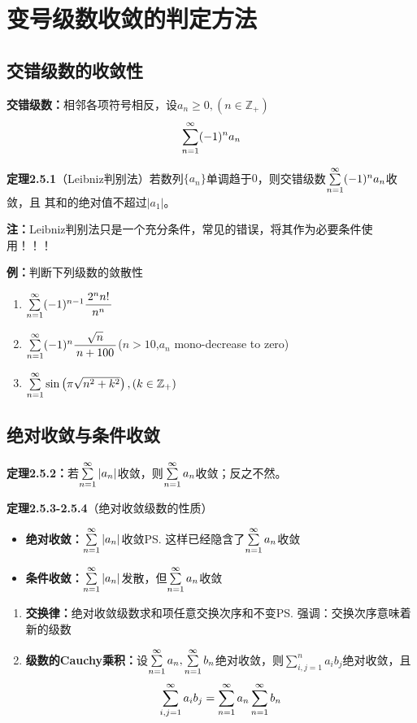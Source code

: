 \section{变号级数收敛的判定方法}

\subsection{交错级数的收敛性}

{\bf 交错级数：}相邻各项符号相反，设$a_n\geq 0,(n\in\mathbb{Z}_+)$
$$\sum\limits_{n=1}^{\infty}(-1)^na_n$$

{\bf 定理2.5.1}（Leibniz判别法）若数列$\{a_n\}$单调趋于$0$，则交错级数$\sum\limits_{n=1}^{\infty} (-1)^na_n$收敛，且
其和的绝对值不超过$|a_1|$。

{\bf 注：}Leibniz判别法只是一个充分条件，常见的错误，将其作为必要条件使用！！！

{\bf 例：}判断下列级数的敛散性
\begin{enumerate} [(1)]
  \setlength{\itemindent}{1cm}
  \item $\sum\limits_{n=1}^{\infty}(-1)^{n-1}\displaystyle\frac{\,{2^nn!}\,}{\,{n^n}\,}$ 
  \item $\sum\limits_{n=1}^{\infty}(-1)^n\displaystyle\frac{\,{\sqrt{n}}\,}{\,{n+100}\,}$\hfill{($n>10$,$a_n$ mono-decrease to
  zero)}
  \item $\sum\limits_{n=1}^{\infty}\sin\left(\pi\sqrt{n^2+k^2}\right),(k\in\mathbb{Z}_+)$
\end{enumerate}

\subsection{绝对收敛与条件收敛}

{\bf 定理2.5.2：}若$\sum\limits_{n=1}^{\infty} |a_n|$收敛，则$\sum\limits_{n=1}^{\infty} a_n$收敛；反之不然。

{\bf 定理2.5.3-2.5.4}（绝对收敛级数的性质）

\begin{itemize}
  \setlength{\itemindent}{1cm}
  \item {\bf 绝对收敛：}$\sum\limits_{n=1}^{\infty} |a_n|$收敛\ps{这样已经隐含了$\sum\limits_{n=1}^{\infty} a_n$收敛}
  \item {\bf 条件收敛：}$\sum\limits_{n=1}^{\infty} |a_n|$发散，但$\sum\limits_{n=1}^{\infty} a_n$收敛
\end{itemize}

\begin{enumerate}[(1)]
  \setlength{\itemindent}{1cm}
  \item {\bf 交换律：}绝对收敛级数求和项任意交换次序和不变\ps{强调：交换次序意味着新的级数}
  \item {\bf 级数的Cauchy乘积：}设$\sum\limits_{n=1}^{\infty} a_n,\sum\limits_{n=1}^{\infty}
	  b_n$绝对收敛，则$\sum\limits_{i,j=1}^na_ib_j$绝对收敛，且
	  $$\sum\limits_{i,j=1}^{\infty}a_ib_j=\sum\limits_{n=1}^{\infty} a_n\sum\limits_{n=1}^{\infty} b_n$$
\end{enumerate}

